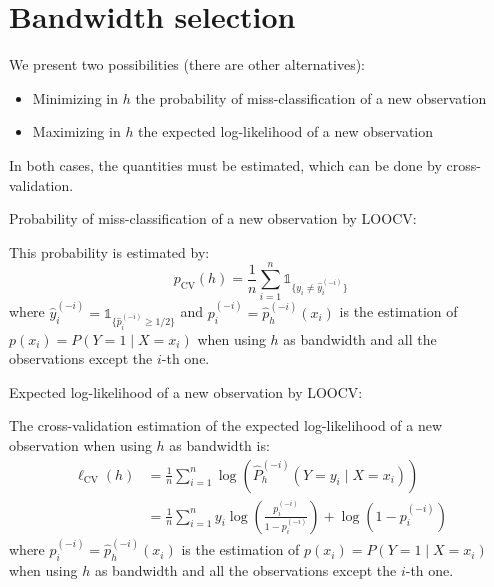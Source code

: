 \pagebreak
\section{Bandwidth selection}
We present two possibilities (there are other alternatives):
\begin{itemize}
    \item Minimizing in $h$ the probability of miss-classification of a new observation
    \item Maximizing in $h$ the expected log-likelihood of a new observation
\end{itemize}
In both cases, the quantities must be estimated, which can be done by cross-validation.

\begin{definition}{Probability of miss-classification}{} of a new observation
    by LOOCV:

    This probability is estimated by:
    \begin{equation*}
        p_\text{CV}(h) = \frac{1}{n} \sum_{i = 1}^n \mathds{1}_{\{y_i \neq \hat{y}_i^{(-i)}\}}
    \end{equation*}
    where $\hat{y}_i^{(-i)} = \mathds{1}_{\{\hat{p}_i^{(-i)} \geq 1/2\}}$ and
    $p_i^{(-i)} = \hat p_h^{(-i)}(x_i)$ is the estimation of
    $p(x_i) = P(Y = 1 \mid X = x_i)$ when using $h$ as bandwidth and all the observations
    except the $i$-th one.
\end{definition}

\begin{definition}{Expected log-likelihood}{} of a new observation by LOOCV:

    The cross-validation estimation of the expected log-likelihood of
    a new observation when using $h$ as bandwidth is:
    \begin{align*}
        \ell_\text{CV}(h) &= \frac{1}{n} \sum_{i = 1}^n \log\left(
            \widehat{P}_h^{(-i)}(Y = y_i \mid X = x_i)
        \right) \\
                          &= \frac{1}{n} \sum_{i = 1}^n 
                              y_i \log\left(
                                  \frac{{p}_i^{(-i)}}{1 - {p}_i^{(-i)}}
                              \right) + \log\left(1 - {p}_i^{(-i)}\right)
    \end{align*}
    where ${p}_i^{(-i)} = \hat p_h^{(-i)}(x_i)$ is the estimation of
    $p(x_i) = P(Y = 1 \mid X = x_i)$ when using $h$ as bandwidth and all the observations
    except the $i$-th one.
\end{definition}
